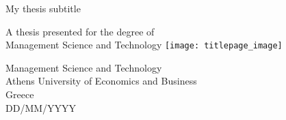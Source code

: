 \begin{titlepage}
    \begin{center}
        \vspace*{1cm}
 
        \Huge
	\vfill
        \vspace{0.5cm}
        \LARGE
        My thesis subtitle
 
        \vspace{1.5cm}
	\vspace{2.5cm}
 
        A thesis presented for the degree of\\
        Management Science and Technology
        \vspace{0.8cm}
	\texttt{[image: titlepage\_image]}
	\vfill

        \Large
        Management Science and Technology\\
        Athens University of Economics and Business\\
        Greece\\
        DD/MM/YYYY
	\vspace{2.5cm}
 
    \end{center}
\end{titlepage}